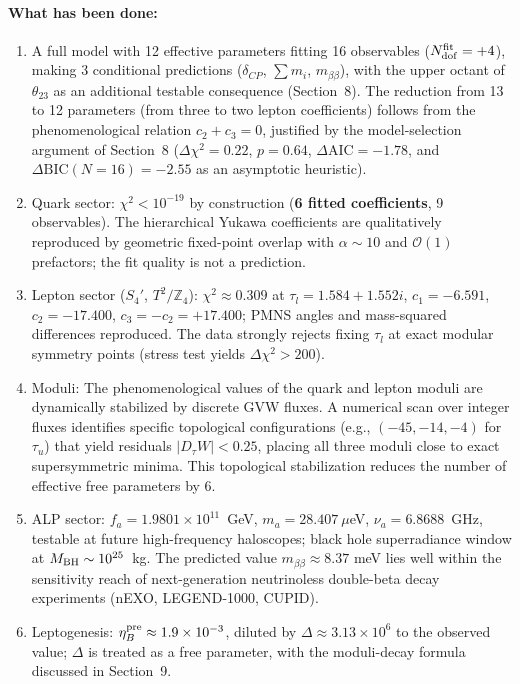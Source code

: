 \documentclass[12pt,a4paper]{article}
\numberwithin{equation}{section}
\begin{document}
\paragraph{What has been done:}
\begin{enumerate}[leftmargin=1.5em]
\item A full model with 12 effective parameters fitting
16 observables (\(N_{\rm dof}^{\rm fit} = +4\)), making 3 conditional
predictions (\(\delta_{CP}\), \(\sum m_i\), \(m_{\beta\beta}\)), with the
upper octant of \(\theta_{23}\) as an additional testable consequence
(Section~8). The reduction from 13 to 12 parameters (from three
to two lepton coefficients) follows from the phenomenological
relation \(c_2 + c_3 = 0\), justified by the model-selection argument
of Section~8 (\(\Delta\chi^2 = 0.22\), \(p = 0.64\), \(\Delta\mathrm{AIC} = -1.78\), and \(\Delta\mathrm{BIC}(N{=}16) = -2.55\) as an asymptotic heuristic).
\item Quark sector: \(\chi^2 < 10^{-19}\) by construction (\textbf{6 fitted coefficients}, 9 observables). The hierarchical Yukawa coefficients are qualitatively reproduced by geometric fixed-point overlap with \(\alpha \sim 10\) and \(\mathcal{O}(1)\) prefactors; the fit quality is not a prediction.
\item Lepton sector (\(S_4'\), \(T^2/\mathbb{Z}_4\)): \(\chi^2 \approx 0.309\) at \(\tau_l = 1.584 + 1.552i\), \(c_1 = -6.591\), \(c_2 = -17.400\), \(c_3 = -c_2 = +17.400\); PMNS angles and mass-squared differences reproduced. The data strongly rejects fixing \(\tau_l\) at exact modular symmetry points (stress test yields \(\Delta\chi^2 > 200\)).
\item Moduli: The phenomenological values of the quark and lepton moduli are dynamically stabilized by discrete GVW fluxes. A numerical scan over integer fluxes identifies specific topological configurations (e.g., \((-45,-14,-4)\) for \(\tau_u\)) that yield residuals \(|D_\tau W| < 0.25\), placing all three moduli close to exact supersymmetric minima. This topological stabilization reduces the number of effective free parameters by 6.
\item ALP sector: \(f_a = 1.9801 \times 10^{11}\)~GeV, \(m_a = 28.407~\mu\)eV, \(\nu_a = 6.8688\)~GHz, testable at future high-frequency haloscopes; black hole superradiance window at \(M_{\rm BH} \sim 10^{25}\)~kg. The predicted value \(m_{\beta\beta} \approx 8.37\) meV lies well within the sensitivity reach of next-generation neutrinoless double-beta decay experiments (nEXO, LEGEND-1000, CUPID).
\item Leptogenesis: \(\eta_B^{\rm pre} \approx 1.9\times10^{-3}\), diluted by \(\Delta \approx 3.13\times 10^6\) to the observed value; \(\Delta\) is treated as a free parameter, with the moduli-decay formula discussed in Section~9.

\end{enumerate}
\end{document}
